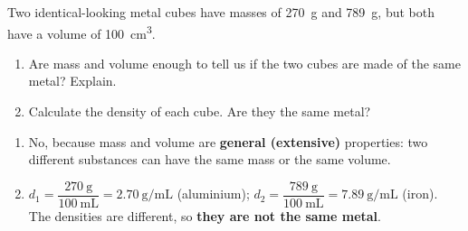 \begin{exercise}
    Two identical-looking metal cubes have masses of \qty{270}{\g} and \qty{789}{\g}, but both have a volume of \qty{100}{\cubic\cm}.
    \begin{enumerate}[label=\letraminuscula]
        \item Are mass and volume enough to tell us if the two cubes are made of the same metal? Explain.
        \item Calculate the density of each cube. Are they the same metal?
    \end{enumerate}
    \begin{solu}
        \begin{enumerate}[label=\alph*)]
            \item No, because mass and volume are \textbf{general (extensive)} properties: two different substances can have the same mass or the same volume.
            \item \(d_1 = \dfrac{\qty{270}{\g}}{\qty{100}{\mL}} = \qty{2.70}{\g\per\mL}\) (aluminium); \(d_2 = \dfrac{\qty{789}{\g}}{\qty{100}{\mL}} = \qty{7.89}{\g\per\mL}\) (iron). The densities are different, so \textbf{they are not the same metal}.
        \end{enumerate}
    \end{solu}
\end{exercise}

